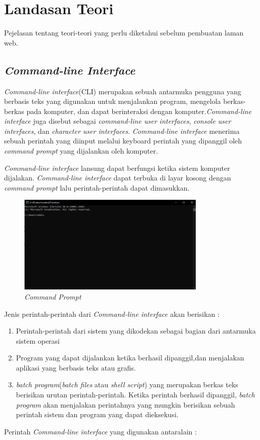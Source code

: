 \chapter{Landasan Teori}
\label{chap:teori}
Pejelasan tentang teori-teori yang perlu diketahui sebelum pembuatan laman web. 

\section{\textit{Command-line Interface}}
\label{sec:CLI}
\textit{Command-line interface}(CLI) merupakan sebuah antarmuka pengguna yang berbasis teks yang digunakan untuk menjalankan program, mengelola berkas-berkas pada komputer, dan dapat berinteraksi dengan komputer.\textit{Command-line interface} juga disebut sebagai \textit{command-line user interfaces}, \textit{console user interfaces}, dan \textit{character user interfaces}. \textit{Command-line interface} menerima sebuah perintah yang diinput melalui keyboard perintah yang dipanggil oleh \textit{command prompt} yang dijalankan oleh komputer.

\textit{Command-line interface} lansung dapat berfungsi ketika sistem komputer dijalakan. \textit{Command-line interface} dapat terbuka di layar kosong dengan \textit{command prompt} lalu perintah-perintah dapat dimasukkan.   
 
\begin{figure}[H]
	\centering
	\includegraphics[width=0.8\textwidth]{Gambar/commandprompt.png}
	\caption{\textit{Command Prompt}}
	\label{fig:cmd}
\end{figure}

Jenis perintah-perintah dari \textit{Command-line interface} akan berisikan :

\begin{enumerate}
	\item Perintah-perintah dari sistem yang dikodekan sebagai bagian dari antarmuka sistem operasi
	\item Program yang dapat dijalankan ketika berhasil dipanggil,dan menjalakan aplikasi yang berbasis teks atau grafis.
	\item \textit{batch program}(\textit{batch files} atau \textit{shell script}) yang merupakan berkas teks berisikan urutan perintah-perintah. Ketika perintah berhasil dipanggil, \textit{batch program} akan menjalakan perintahnya yang mungkin berisikan sebuah perintah sistem dan program yang dapat dieksekusi.
\end{enumerate}
Perintah \textit{Command-line interface} yang digunakan antaralain :
